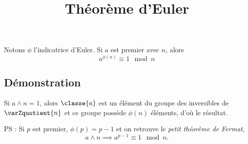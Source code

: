\documentclass[fontsize=12pt,twoside=false,parskip=half]{scrartcl}
\title{Théorème d’Euler}
\date{}
\author{}
\begin{document}
\maketitle
   \begin{Theoreme}
      Notons $\phi$ l’indicatrice d’Euler. Si $a$ est premier avec $n$, alors
      \[
         a^{\phi(n)} \equiv 1 \mod n
      \]
   \end{Theoreme}
   \subsection{Démonstration}
      Si $a \wedge n = 1$, alors $\classe{a}$ est un élément du groupe des inversibles de  $\varZquotient{n}$ et ce groupe possède $\phi(n)$ éléments, d’où le résultat.

      PS : Si $p$ est premier, $\phi(p) = p - 1$ et on retrouve le \emph{petit théorème de Fermat},
      \[
         a \wedge n \implies a^{p - 1} \equiv 1 \mod n.
      \]
\end{document}
